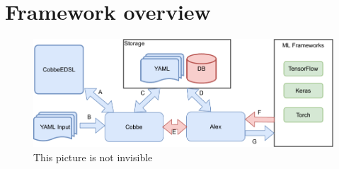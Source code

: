 \section{Framework overview}



\begin{figure}
  \includegraphics[width=\columnwidth]{pictures/framework_pic}
  \caption{This picture is not invisible}
\end{figure}
